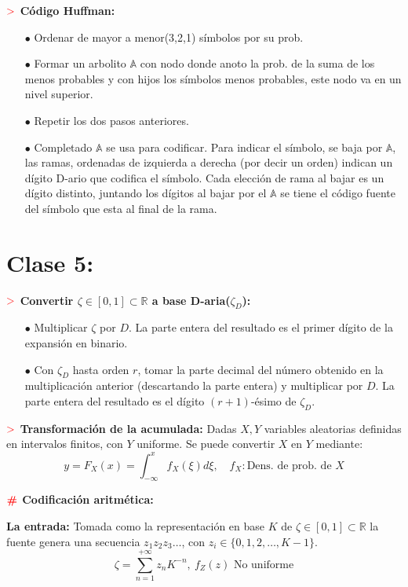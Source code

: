 \documentclass[%
 reprint,
 amsmath,amssymb,
 aps,
]{revtex4-1}
\begin{document}
\textbf{$\textcolor{red}{\mathbf{>}}$ Código Huffman:} 
\begin{enumerate}
  \item[$\bullet$] Ordenar de mayor a menor(3,2,1) símbolos por su prob.
  \item[$\bullet$] Formar un arbolito $\mathbb{A}$ con nodo donde anoto la prob. de la suma de los menos probables y con hijos los símbolos menos probables, este nodo va en un nivel superior.
  \item[$\bullet$] Repetir los dos pasos anteriores.
  \item[$\bullet$] Completado $\mathbb{A}$ se usa para codificar. Para indicar el símbolo, se baja por $\mathbb{A}$, las ramas, ordenadas de izquierda a derecha (por decir un orden) indican un dígito D-ario que codifica el símbolo. Cada elección de rama al bajar es un dígito distinto, juntando los dígitos al bajar por el $\mathbb{A}$ se tiene el código fuente del símbolo que esta al final de la rama.
\end{enumerate}

\section{Clase 5:}

\textbf{$\textcolor{red}{\mathbf{>}}$ Convertir $\zeta \in [0,1] \subset \mathbb{R}$ a base D-aria($\zeta_D$):}
\begin{itemize}
  \item[$\bullet$] Multiplicar $\zeta$ por $D$. La parte entera del resultado es el primer dígito de la expansión en binario.
  \item[$\bullet$] Con $\zeta_D$ hasta orden $r$, tomar la parte decimal del número obtenido en la multiplicación anterior (descartando la parte entera) y multiplicar por $D$. La parte entera del resultado es el dígito $(r+1)$-ésimo de $\zeta_D$.
\end{itemize}

\textbf{$\textcolor{red}{\mathbf{>}}$ Transformación de la acumulada:}
Dadas $X, Y$ variables aleatorias definidas en intervalos finitos, con $Y$ uniforme. Se puede convertir $X$ en $Y$ mediante:
$$y = F_X(x) = \int_{-\infty}^x f_X (\xi) d\xi, \quad f_X: \text{Dens. de prob. de } X$$

\textbf{$\color{red}{\textbf{\#}}$ Codificación aritmética:} 

\textbf{La entrada:} 
Tomada como la representación en base $K$ de $\zeta \in [0,1] \subset \mathbb{R}$ la fuente genera una secuencia $z_{1} z_{2} z_{3} \ldots$, con $z_{i} \in\{0,1,2, \ldots, K-1\}$.
$$
\zeta=\sum_{n=1}^{+\infty} z_{n} K^{-n}, \ f_Z (z) \text{ No uniforme}
$$ 
\end{document}

